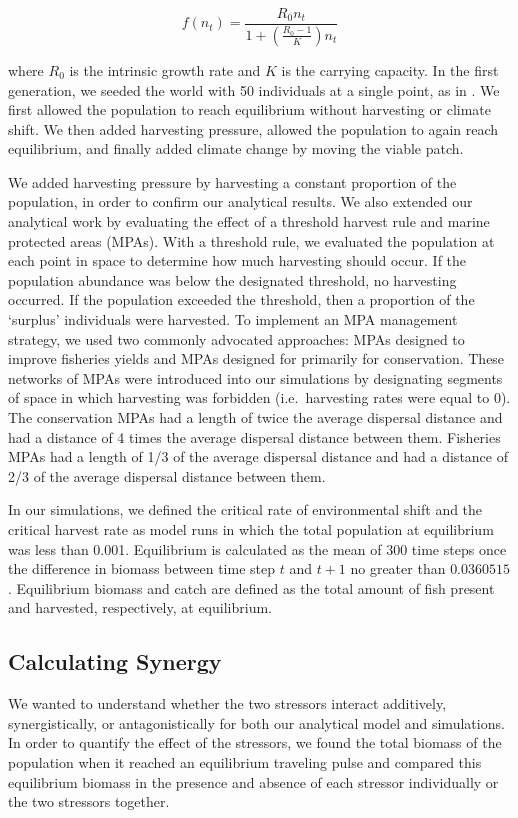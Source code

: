 \documentclass[12pt,english]{article}
\begin{document}
\begin{spacing}{1.9}
\begin{flushleft}
\[f(n_t)=\frac{R_0n_t}{1+\left(\frac{R_0-1}{K}\right)n_t}\]

\noindent where $R_0$ is the intrinsic growth rate and $K$ is the carrying capacity.  In the first generation, we seeded the world with 50 individuals at a single point, as in 
\citep{ZhouKot2011}. We first allowed the population to reach equilibrium without harvesting or climate shift.  We then 
added harvesting pressure, allowed the population to again reach equilibrium, and finally added climate 
change by moving the viable patch.

We added harvesting pressure by harvesting a constant proportion of the population, in order to confirm our analytical results. 
We also extended our analytical work by evaluating the effect of a threshold harvest rule and marine protected 
areas (MPAs). With a threshold rule, we evaluated the population at each point in space to determine how 
much harvesting should occur. If the population abundance was below the designated threshold, no 
harvesting occurred. If the population exceeded the threshold, then a proportion of the `surplus' individuals 
were harvested. To implement an MPA management strategy, we used two commonly advocated approaches: 
MPAs designed to improve fisheries yields and MPAs designed for primarily for conservation. These networks 
of MPAs were introduced into our simulations by designating segments of space in which harvesting was 
forbidden (i.e.~harvesting rates were equal to $0$). The conservation MPAs had a length of twice the average 
dispersal distance and had a distance of 4 times the average dispersal distance between them. Fisheries MPAs had a length of 1/3 of the 
average dispersal distance and had a distance of 2/3 of the average dispersal distance between them.

In our simulations, we defined the critical rate of environmental shift and the critical harvest rate as model runs 
in which the total population at equilibrium was less than 0.001. Equilibrium is calculated as the mean of 300 time steps once the difference in biomass between time step $t$ and $t+1$ no greater than $0.0360515$. Equilibrium biomass and catch are defined as the total amount of fish present and harvested, respectively, at equilibrium. 

\subsection{Calculating Synergy }

We wanted to understand whether the two stressors interact 
additively, synergistically, or antagonistically \citep{Crainetal2008} for both our analytical model and simulations. In order to quantify the effect of the 
stressors, we found the total biomass of the population when it reached an equilibrium traveling pulse and 
compared this equilibrium biomass in the presence and absence of each stressor individually or the two stressors together. 


\end{flushleft}
\end{spacing}
\end{document}
